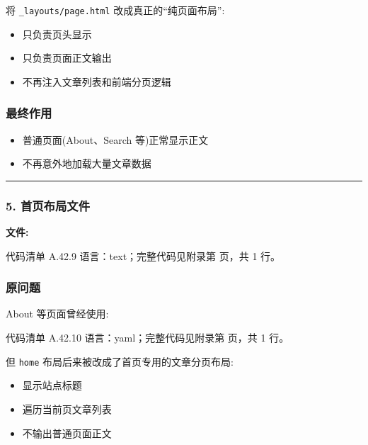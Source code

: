 \documentclass[lang=cn,scheme=chinese,color=blue,device=normal,toc=onecol,math=cm]{elegantbook}
\begin{document}
将 \texttt{\_\allowbreak{}layouts/\allowbreak{}page.html} 改成真正的“纯页面布局”:\par


\begin{itemize}
\item 只负责页头显示
\item 只负责页面正文输出
\item 不再注入文章列表和前端分页逻辑
\end{itemize}


\subsubsection{最终作用}


\begin{itemize}
\item 普通页面(About、Search 等)正常显示正文
\item 不再意外地加载大量文章数据
\end{itemize}


\medskip\hrule\medskip


\subsubsection{5. 首页布局文件}


\textbf{文件:}\par


\begin{codeindexbox}{代码清单 A.42.9}
语言：text；完整代码见附录第 \pageref{code:42:9} 页，共 1 行。
\end{codeindexbox}


\subsubsection{原问题}


About 等页面曾经使用:\par


\begin{codeindexbox}{代码清单 A.42.10}
语言：yaml；完整代码见附录第 \pageref{code:42:10} 页，共 1 行。
\end{codeindexbox}


但 \texttt{home} 布局后来被改成了首页专用的文章分页布局:\par


\begin{itemize}
\item 显示站点标题
\item 遍历当前页文章列表
\item 不输出普通页面正文
\end{itemize}
\end{document}
